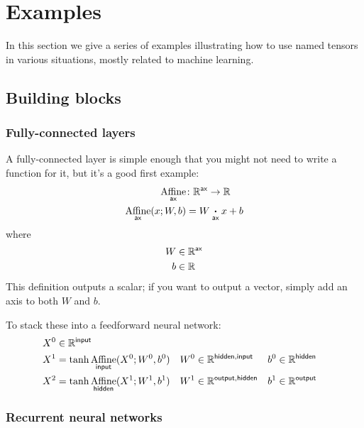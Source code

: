 \documentclass{article}
\newcommand{\reals}{\mathbb{R}}
\begin{document}
\section{Examples}
\label{sec:examples}

In this section we give a series of examples illustrating how to use named tensors in various situations, mostly related to machine learning.

\subsection{Building blocks}

\subsubsection{Fully-connected layers}

A fully-connected layer is simple enough that you might not need to write a function for it, but it's a good first example:
\begin{align*}
  \nfun{ax}{Affine} &\colon \reals^{\name{ax}} \rightarrow \reals \\
  \nfun{ax}{Affine}(x; W, b) &= W \ndot{ax} x + b
\end{align*}
where
\begin{align*}
  W &\in \reals^{\name{ax}} \\
  b &\in \reals
\end{align*}
This definition outputs a scalar; if you want to output a vector, simply add an axis to both $W$ and $b$.

To stack these into a feedforward neural network:
\begin{align*}
  X^0 &\in \mathbb{R}^{\name{input}} \\
  X^1 &= \tanh \nfun{input}{Affine}(X^0; W^0, b^0) & W^0 &\in \mathbb{R}^{\name{hidden},\name{input}} & b^0 &\in \mathbb{R}^{\name{hidden}} \\
  X^2 &= \tanh \nfun{hidden}{Affine}(X^1; W^1, b^1) & W^1 &\in \mathbb{R}^{\name{output},\name{hidden}} & b^1 &\in \mathbb{R}^{\name{output}}
\end{align*}
  
\subsubsection{Recurrent neural networks}
\label{sec:rnn}
\end{document}
